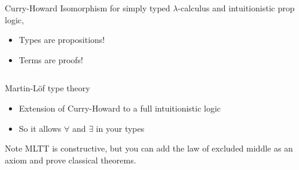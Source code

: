 \documentclass{beamer}
\begin{document}
\begin{frame}{Curry-Howard Isomorphism}
  for simply typed $\lambda$-calculus and intuitionistic prop logic,
  \begin{itemize}
    \item Types are propositions!
    \pause
    \item Terms are proofs!
  \end{itemize}

  \pause
  \begin{columns}
    \begin{column}{0.5\textwidth}
      \begin{prooftree}
      \end{prooftree}
    \end{column}
    \pause
    \begin{column}{0.5\textwidth}
      \begin{prooftree}
      \end{prooftree}
    \end{column}
  \end{columns}
 \pause
  \begin{columns}
    \begin{column}{0.5\textwidth}
      \begin{prooftree}
      \end{prooftree}
    \end{column}
    \pause
    \begin{column}{0.5\textwidth}
      \begin{prooftree}
      \end{prooftree}
    \end{column}
  \end{columns}

\end{frame}

\begin{frame}{Martin-L\"{o}f type theory}
  \begin{itemize}
    \item Extension of Curry-Howard to a full intuitionistic logic
    \item So it allows $\forall$ and $\exists$ in your types
  \end{itemize}
  \pause
  \begin{alertblock}{Note}
  MLTT is constructive, but you can add
  the law of excluded middle as an axiom and prove classical theorems.
  \end{alertblock}
\end{frame}
\end{document}
